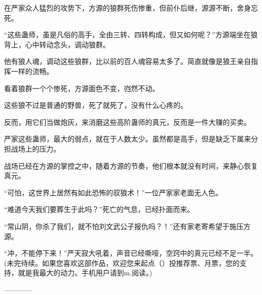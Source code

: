 \begin{this_body}
在严家众人猛烈的攻势下，方源的狼群死伤惨重，但前仆后继，源源不断，舍身忘死。

“这些蛊师，虽是凡俗的高手，全由三转、四转构成，但又如何呢？”方源端坐在狼背上，心中转动念头，调动狼群。

他有狼人魂，调动这些狼群，比以前的百人魂容易太多了。简直就像是狼王亲自指挥一样的流畅。

看着狼群一个个惨死，方源面色不变，岿然不动。

这些狼不过是普通的野兽，死了就死了，没有什么心疼的。

反而，用它们当做炮灰，来消磨这些高阶蛊师的真元，反而是一件大赚的买卖。

严家这些蛊师，最大的弱点，就在于人数太少。虽然都是高手，但是缺乏下属来分担战场上的压力。

战场已经在方源的掌控之中，随着方源的节奏，他们根本就没有时间，来静心恢复真元。

“可怕，这世界上居然有如此恐怖的驭狼术！”一位严家家老面无人色。

“难道今天我们要葬生于此吗？”死亡的气息，已经扑面而来。

“常山阴，你杀了我们，就不怕刘文武公子报仇吗？！”还有家老寄希望于施压方源。

“冲，不能停下来！”严天寂大吼着，声音已经嘶哑，空窍中的真元已经不足一半。(未完待续。如果您喜欢这部作品，欢迎您来起点（）投推荐票、月票，您的支持，就是我最大的动力。手机用户请到m.阅读。)

------------

\end{this_body}

